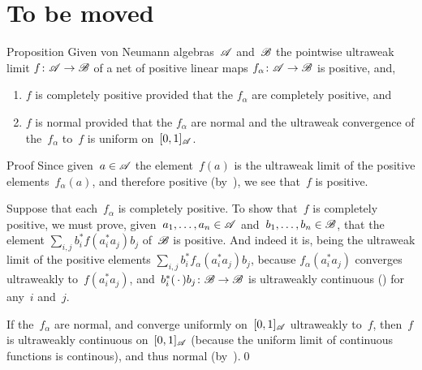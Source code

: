 \documentclass[a]{subfiles}
\begin{document}
\section{To be moved}
\begin{parsec}%
\begin{point}{Proposition}%
Given von Neumann algebras~$\mathscr{A}$
and~$\mathscr{B}$
the pointwise ultraweak limit
$f\colon \mathscr{A}\to\mathscr{B}$
of a net of  positive linear maps $f_\alpha\colon \mathscr{A}\to\mathscr{B}$
is positive, and, 
\begin{enumerate}
\item
$f$ is completely positive provided
that the $f_\alpha$ are completely positive, and
\item
$f$ is normal provided that the $f_\alpha$ are normal
and the ultraweak convergence of the~$f_\alpha$ to~$f$
is uniform on~$[0,1]_{\mathscr{A}}$.
\end{enumerate}
\begin{point}{Proof}%
Since given~$a\in \mathscr{A}$ the element~$f(a)$
is the ultraweak limit of the positive elements~$f_\alpha(a)$,
and therefore positive (by~),
we see that~$f$ is positive.

Suppose that each~$f_\alpha$ is completely positive.
To show that~$f$ is completely positive,
we must prove, given~$a_1,\dotsc,a_n\in\mathscr{A}$
and~$b_1,\dotsc,b_n\in\mathscr{B}$,
that 
the element $\sum_{i,j} b_i^* f(a_i^*a_j)b_j$
of~$\mathscr{B}$
is positive.
And indeed it is,
being the ultraweak limit of
the positive elements $\sum_{i,j} b_i^* f_\alpha (a_i^* a_j)b_j$,
because  $f_\alpha(a_i^* a_j)$
converges ultraweakly to~$f(a_i^* a_j)$,
and~$b_i^*(\,\cdot\,)b_j\colon \mathscr{B}\to\mathscr{B}$
is ultraweakly continuous
()
for any~$i$ and~$j$.

If the~$f_\alpha$ 
are normal,
and converge uniformly on~$[0,1]_{\mathscr{A}}$ ultraweakly
to~$f$,
then~$f$ is ultraweakly continuous
on~$[0,1]_{\mathscr{A}}$
(because the uniform limit of continuous functions is continous),
and thus normal (by~).\qed
\end{point}
\end{point}
\end{parsec}
\end{document}
